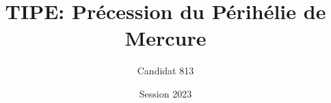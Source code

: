 






\title[TIPE Mercure]{TIPE: Précession du Périhélie de Mercure}
\author[813]{Candidat 813} %
\date{Session 2023}













\appendix










